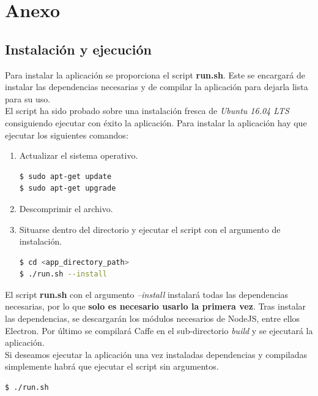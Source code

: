\documentclass[a4paper,11pt]{book}
\begin{document}
\chapter{Anexo}
\section{Instalación y ejecución}
Para instalar la aplicación se proporciona el script \textbf{run.sh}. Este se encargará de instalar las dependencias necesarias y de compilar la aplicación para dejarla lista para su uso.\\
El script ha sido probado sobre una instalación fresca de \textit{Ubuntu 16.04 LTS} consiguiendo ejecutar con éxito la aplicación. Para instalar la aplicación hay que ejecutar los siguientes comandos:
\begin{enumerate}
	\item Actualizar el sistema operativo.
\begin{lstlisting}[language=bash]
$ sudo apt-get update
$ sudo apt-get upgrade
\end{lstlisting}
	\item Descomprimir el archivo.
	\item Situarse dentro del directorio y ejecutar el script con el argumento de instalación.
\begin{lstlisting}[language=bash]
$ cd <app_directory_path>
$ ./run.sh --install
\end{lstlisting}
\end{enumerate}
El script \textbf{run.sh} con el argumento \textit{--install} instalará todas las dependencias necesarias, por lo que \textbf{solo es necesario usarlo la primera vez}. Tras instalar las dependencias, se descargarán los módulos necesarios de NodeJS, entre ellos Electron. Por último se compilará Caffe en el sub-directorio \textit{build} y se ejecutará la aplicación.\\
Si deseamos ejecutar la aplicación una vez instaladas dependencias y compiladas simplemente habrá que ejecutar el script sin argumentos.
\begin{lstlisting}[language=bash]
$ ./run.sh
\end{lstlisting}
\end{document}
